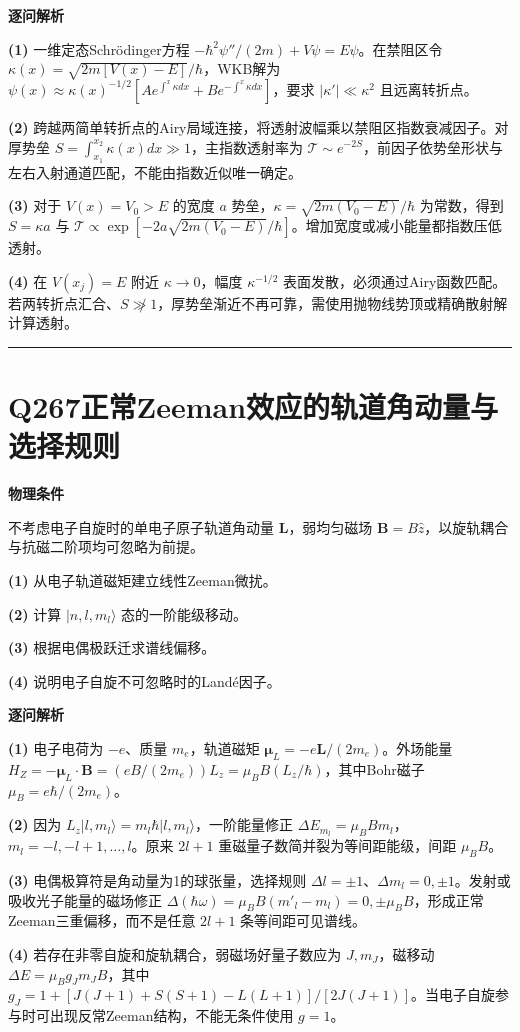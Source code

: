 \documentclass[UTF8,a4paper,11pt,oneside,openany]{ctexbook}
\begin{document}
\par\medskip\noindent\textbf{逐问解析}
\par\noindent\textbf{(1)} 一维定态Schrödinger方程 \(-\hbar^2\psi''/(2m)+V\psi=E\psi\)。在禁阻区令 \(\kappa(x)=\sqrt{2m[V(x)-E]}/\hbar\)，WKB解为 \(\psi(x)\approx\kappa(x)^{-1/2}[A e^{\int^x\kappa dx}+B e^{-\int^x\kappa dx}]\)，要求 \(|\kappa'|\ll\kappa^2\) 且远离转折点。
\par\noindent\textbf{(2)} 跨越两简单转折点的Airy局域连接，将透射波幅乘以禁阻区指数衰减因子。对厚势垒 \(S=\int_{x_1}^{x_2}\kappa(x)dx\gg1\)，主指数透射率为 \(\mathcal T\sim e^{-2S}\)，前因子依势垒形状与左右入射通道匹配，不能由指数近似唯一确定。
\par\noindent\textbf{(3)} 对于 \(V(x)=V_0>E\) 的宽度 \(a\) 势垒，\(\kappa=\sqrt{2m(V_0-E)}/\hbar\) 为常数，得到 \(S=\kappa a\) 与 \(\mathcal T\propto\exp[-2a\sqrt{2m(V_0-E)}/\hbar]\)。增加宽度或减小能量都指数压低透射。
\par\noindent\textbf{(4)} 在 \(V(x_j)=E\) 附近 \(\kappa\to0\)，幅度 \(\kappa^{-1/2}\) 表面发散，必须通过Airy函数匹配。若两转折点汇合、\(S\not\gg1\)，厚势垒渐近不再可靠，需使用抛物线势顶或精确散射解计算透射。

\par\bigskip\hrule\bigskip
\section*{Q267\quad 正常Zeeman效应的轨道角动量与选择规则}
\textbf{物理条件}\par 不考虑电子自旋时的单电子原子轨道角动量 \(\boldsymbol L\)，弱均匀磁场 \(\boldsymbol B=B\hat z\)，以旋轨耦合与抗磁二阶项均可忽略为前提。
\par\noindent\textbf{(1)} 从电子轨道磁矩建立线性Zeeman微扰。
\par\noindent\textbf{(2)} 计算 \(|n,l,m_l\rangle\) 态的一阶能级移动。
\par\noindent\textbf{(3)} 根据电偶极跃迁求谱线偏移。
\par\noindent\textbf{(4)} 说明电子自旋不可忽略时的Landé因子。

\par\medskip\noindent\textbf{逐问解析}
\par\noindent\textbf{(1)} 电子电荷为 \(-e\)、质量 \(m_e\)，轨道磁矩 \(\boldsymbol\mu_L=-e\boldsymbol L/(2m_e)\)。外场能量 \(H_Z=-\boldsymbol\mu_L\cdot\boldsymbol B=(eB/(2m_e))L_z=\mu_B B(L_z/\hbar)\)，其中Bohr磁子 \(\mu_B=e\hbar/(2m_e)\)。
\par\noindent\textbf{(2)} 因为 \(L_z|l,m_l\rangle=m_l\hbar|l,m_l\rangle\)，一阶能量修正 \(\Delta E_{m_l}=\mu_BBm_l\)，\(m_l=-l,-l+1,\ldots,l\)。原来 \(2l+1\) 重磁量子数简并裂为等间距能级，间距 \(\mu_BB\)。
\par\noindent\textbf{(3)} 电偶极算符是角动量为1的球张量，选择规则 \(\Delta l=\pm1\)、\(\Delta m_l=0,\pm1\)。发射或吸收光子能量的磁场修正 \(\Delta(\hbar\omega)=\mu_BB(m'_l-m_l)=0,\pm\mu_BB\)，形成正常Zeeman三重偏移，而不是任意 \(2l+1\) 条等间距可见谱线。
\par\noindent\textbf{(4)} 若存在非零自旋和旋轨耦合，弱磁场好量子数应为 \(J,m_J\)，磁移动 \(\Delta E=\mu_Bg_Jm_JB\)，其中 \(g_J=1+[J(J+1)+S(S+1)-L(L+1)]/[2J(J+1)]\)。当电子自旋参与时可出现反常Zeeman结构，不能无条件使用 \(g=1\)。
\end{document}
